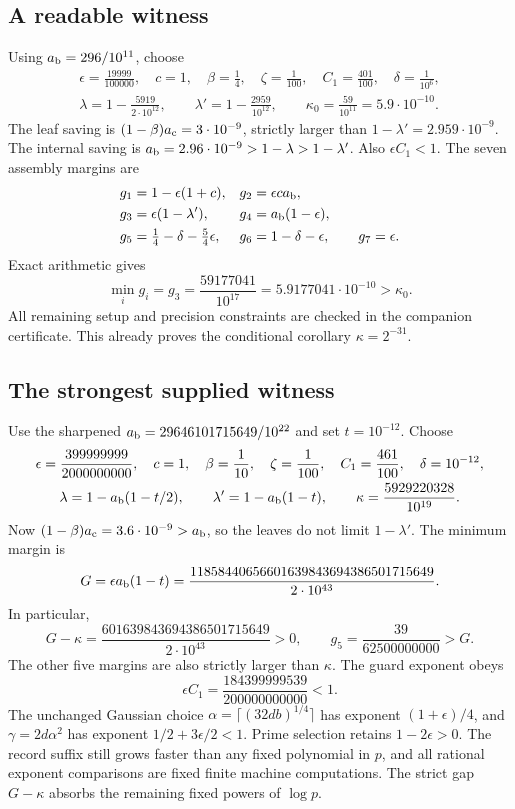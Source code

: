 \documentclass[11pt]{article}
\newcommand{\ab}{a_{\rm b}}
\newcommand{\ac}{a_{\rm c}}
\begin{document}
\subsection{A readable witness}
Using $\ab=296/10^{11}$, choose
\[
\begin{gathered}
 \epsilon=\frac{19999}{100000},\quad c=1,\quad
 \beta=\frac14,\quad\zeta=\frac1{100},\quad
 C_1=\frac{401}{100},\quad\delta=\frac1{10^6},\\
 \lambda=1-\frac{5919}{2\cdot10^{12}},\qquad
 \lambda'=1-\frac{2959}{10^{12}},\qquad
 \kappa_0=\frac{59}{10^{11}}=5.9\cdot10^{-10}.
\end{gathered}
\]
The leaf saving is $(1-\beta)\ac=3\cdot10^{-9}$, strictly larger
than $1-\lambda'=2.959\cdot10^{-9}$.  The internal saving is
$\ab=2.96\cdot10^{-9}>1-\lambda>1-\lambda'$.  Also
$\epsilon C_1<1$.  The seven assembly margins are
\begin{align*}
 g_1&=1-\epsilon(1+c), &g_2&=\epsilon c\ab,\\
 g_3&=\epsilon(1-\lambda'), &g_4&=\ab(1-\epsilon),\\
 g_5&=\tfrac14-\delta-\tfrac54\epsilon,
 &g_6&=1-\delta-\epsilon,\qquad g_7=\epsilon.
\end{align*}
Exact arithmetic gives
\[
 \min_i g_i=g_3=\frac{59177041}{10^{17}}
              =5.9177041\cdot10^{-10}>\kappa_0.
\]
All remaining setup and precision constraints are checked in the companion
certificate.  This already proves the conditional corollary $\kappa=2^{-31}$.

\subsection{The strongest supplied witness}
Use the sharpened $\ab=29646101715649/10^{22}$ and set
$t=10^{-12}$.  Choose
\[
\begin{gathered}
 \epsilon=\frac{399999999}{2000000000},\quad c=1,\quad
 \beta=\frac1{10},\quad\zeta=\frac1{100},\quad
 C_1=\frac{461}{100},\quad\delta=10^{-12},\\
 \lambda=1-\ab(1-t/2),\qquad
 \lambda'=1-\ab(1-t),\qquad
 \kappa=\frac{5929220328}{10^{19}}.
\end{gathered}
\]
Now $(1-\beta)\ac=3.6\cdot10^{-9}>\ab$, so the leaves do not
limit $1-\lambda'$.  The minimum margin is
\[
 G=\epsilon\ab(1-t)
   =\frac{11858440656601639843694386501715649}{2\cdot10^{43}}.
\]
In particular,
\[
 G-\kappa
 =\frac{601639843694386501715649}{2\cdot10^{43}}>0,
 \qquad g_5=\frac{39}{62500000000}>G.
\]
The other five margins are also strictly larger than $\kappa$.
The guard exponent obeys
\[
 \epsilon C_1=\frac{184399999539}{200000000000}<1.
\]
The unchanged Gaussian choice $\alpha=\lceil(32db)^{1/4}\rceil$
has exponent $(1+\epsilon)/4$, and
$\gamma=2d\alpha^2$ has exponent $1/2+3\epsilon/2<1$.
Prime selection retains $1-2\epsilon>0$.  The record suffix still grows
faster than any fixed polynomial in $p$, and all rational exponent
comparisons are fixed finite machine computations.  The strict gap
$G-\kappa$ absorbs the remaining fixed powers of $\log p$.
\end{document}

